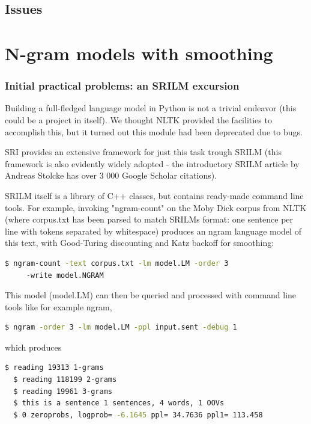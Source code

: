 \documentclass[a4paper,12pt]{article}
\begin{document}
\subsection{Issues}









\section{N-gram models with smoothing}

\subsubsection{Initial practical problems: an SRILM excursion}
Building a full-fledged language model in Python is not a trivial endeavor (this could be a project in itself). We thought NLTK provided the facilities to accomplish this, but it turned out this module had been deprecated due to bugs. 

SRI provides an extensive framework for just this task trough SRILM (this framework is also evidently widely adopted - the introductory SRILM article by Andreas Stolcke has over 3 000 Google Scholar citations). 

SRILM itself is a library of C++ classes, but contains ready-made command line tools. For example, invoking "ngram-count" on the Moby Dick corpus from NLTK (where corpus.txt has been parsed to match SRILMs format: one sentence per line with tokens separated by whitespace) produces an ngram language model of this text, with Good-Turing discounting and Katz backoff for smoothing:

\begin{lstlisting}[language=bash]
  $ ngram-count -text corpus.txt -lm model.LM -order 3
     -write model.NGRAM
\end{lstlisting}


This model (model.LM) can then be queried and processed with command line tools like for example ngram,

\begin{lstlisting}[language=bash]
  $ ngram -order 3 -lm model.LM -ppl input.sent -debug 1 
\end{lstlisting}


which produces

\begin{lstlisting}[language=bash]
  $ reading 19313 1-grams 
  $ reading 118199 2-grams
  $ reading 19961 3-grams
  $ this is a sentence 1 sentences, 4 words, 1 OOVs
  $ 0 zeroprobs, logprob= -6.1645 ppl= 34.7636 ppl1= 113.458
\end{lstlisting}
\end{document}
